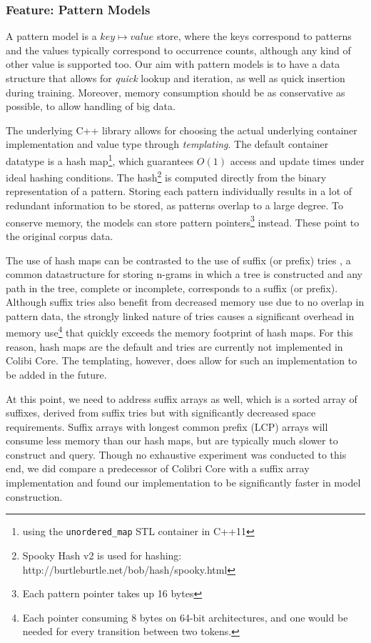 \documentclass[a4paper,12pt]{article}
\begin{document}
\subsubsection{Feature: Pattern Models}
\label{sec:patternmodels}

A pattern model is a $key \mapsto value$ store, where the keys correspond to
patterns and the values typically correspond to occurrence counts, although any
kind of other value is supported too. Our aim with pattern models is to have a
data structure that allows for \emph{quick} lookup and iteration, as well as
quick insertion during training. Moreover, memory consumption should be as
conservative as possible, to allow handling of big data.

The underlying C++ library allows for choosing the actual underlying container
implementation and value type through \emph{templating}. The default container
datatype is a hash map\footnote{using the \texttt{unordered\_map} STL container
in C++11}, which guarantees $O(1)$ access and update times under ideal hashing
conditions. The hash\footnote{Spooky Hash v2 is used for hashing:
http://burtleburtle.net/bob/hash/spooky.html} is computed directly from the
binary representation of a pattern. Storing each pattern individually results
in a lot of redundant information to be stored, as patterns overlap to a large
degree. To conserve memory, the models can store pattern pointers\footnote{Each
pattern pointer takes up 16 bytes} instead. These point to the original corpus
data.

The use of hash maps can be contrasted to the use of suffix (or prefix) tries
\cite{Weiner73}, a common datastructure for storing n-grams in which a tree is
constructed and any path in the tree, complete or incomplete, corresponds to a
suffix (or prefix).  Although suffix tries also benefit from decreased memory
use due to no overlap in pattern data, the strongly linked nature of tries
causes a significant overhead in memory use\footnote{Each pointer consuming 8
    bytes on 64-bit architectures, and one would be needed for every transition
between two tokens.} that quickly exceeds the memory footprint of hash maps.
For this reason, hash maps are the default and tries are currently not
implemented in Colibi Core. The templating, however, does allow for such an
implementation to be added in the future.

At this point, we need to address suffix arrays \cite{Manber90} as well, which
is a sorted array of suffixes, derived from suffix tries but with significantly
decreased space requirements. Suffix arrays with longest common prefix (LCP)
arrays will consume less memory than our hash maps, but are typically much
slower to construct and query. Though no exhaustive experiment was conducted to
this end, we did compare a predecessor of Colibri Core with a suffix array
implementation \cite{Stehouwer10} and found our implementation to be
significantly faster in model construction.
\end{document}
